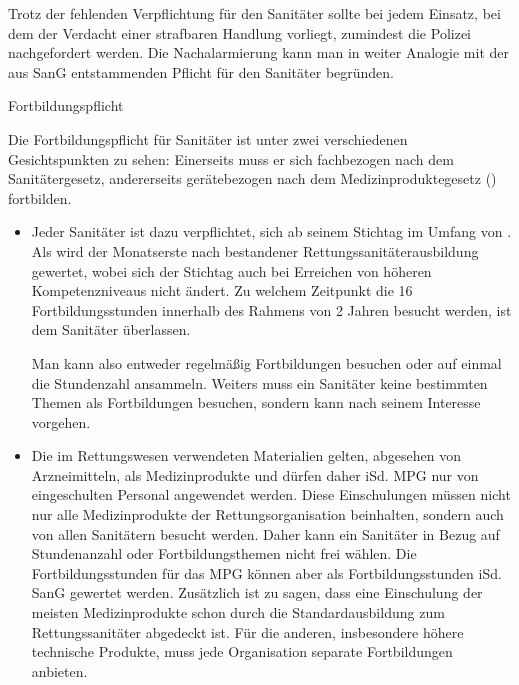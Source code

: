 {\begin{itemize}
\begin{itemize}
  Trotz der fehlenden Verpflichtung für den Sanitäter sollte
  bei jedem Einsatz, bei dem der Verdacht einer strafbaren
  Handlung vorliegt, zumindest die Polizei nachgefordert
  werden. Die Nachalarmierung kann man in weiter Analogie
  mit der aus  SanG entstammenden Pflicht für den
  Sanitäter
   begründen.
  \end{itemize}
\end{itemize}





}
{}
{}
{}
{}

{Fortbildungspflicht}
{\label{topic:fortbildungspflicht}
Die Fortbildungspflicht für Sanitäter ist unter zwei
verschiedenen Gesichtspunkten zu sehen: Einerseits muss er
sich fachbezogen nach dem Sanitätergesetz, andererseits
gerätebezogen nach dem Medizinproduktegesetz ()
fortbilden.

\begin{itemize}
  \item {}
  Jeder Sanitäter ist dazu verpflichtet, sich  ab seinem Stichtag im Umfang von . Als  wird der
  Monatserste nach bestandener Rettungssanitäterausbildung
  gewertet, wobei sich der Stichtag auch bei Erreichen von
  höheren Kompetenzniveaus nicht ändert. Zu welchem Zeitpunkt
  die 16 Fortbildungsstunden innerhalb des Rahmens von 2
  Jahren besucht werden, ist dem Sanitäter überlassen.
  
  Man kann also entweder regelmäßig Fortbildungen besuchen
  oder auf einmal die Stundenzahl ansammeln. Weiters muss ein
  Sanitäter keine bestimmten Themen als Fortbildungen
  besuchen, sondern kann nach seinem Interesse vorgehen.
  
  \item {}
  Die im Rettungswesen verwendeten Materialien gelten,
  abgesehen von Arzneimitteln, als Medizinprodukte und dürfen
  daher iSd. MPG nur von eingeschulten Personal angewendet
  werden. Diese Einschulungen müssen nicht nur alle
  Medizinprodukte der Rettungsorganisation beinhalten, sondern
  auch von allen Sanitätern besucht werden. Daher kann ein
  Sanitäter in Bezug auf Stundenanzahl oder Fortbildungsthemen
  nicht frei wählen. Die Fortbildungsstunden für das MPG
  können aber als Fortbildungsstunden iSd. SanG gewertet
  werden. Zusätzlich ist zu sagen, dass eine Einschulung der
  meisten Medizinprodukte schon durch die Standardausbildung
  zum Rettungssanitäter abgedeckt ist. Für die anderen,
  insbesondere höhere technische Produkte, muss jede
  Organisation separate Fortbildungen anbieten.
\end{itemize}



}
